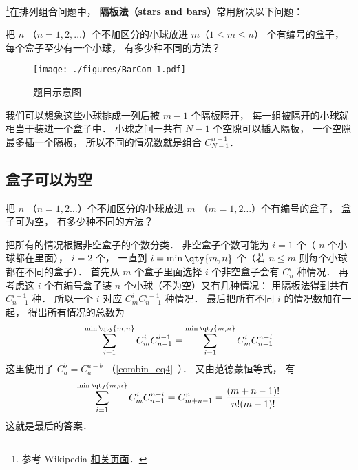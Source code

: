 

\footnote{参考 Wikipedia \href{https://en.wikipedia.org/wiki/Stars_and_bars_(combinatorics)}{相关页面}．}在排列组合问题中， \textbf{隔板法（stars and bars）}常用解决以下问题：

\begin{example}{}
把 $n$ （$n = 1,2,\dots$）个不加区分的小球放进 $m$（$1\leqslant m\leqslant n$） 个有编号的盒子， 每个盒子至少有一个小球， 有多少种不同的方法？
\begin{figure}[ht]
\centering
\texttt{[image: ./figures/BarCom\_1.pdf]}
\caption{题目示意图} \label{BarCom_fig1}
\end{figure}
\end{example}

我们可以想象这些小球排成一列后被 $m-1$ 个隔板隔开， 每一组被隔开的小球就相当于装进一个盒子中． 小球之间一共有 $N-1$ 个空隙可以插入隔板， 一个空隙最多插一个隔板， 所以不同的情况数就是组合 $C_{N-1}^{n-1}$．

\subsection{盒子可以为空}

\begin{example}{}
把 $n$ （$n=1,2\dots$）个不加区分的小球放进 $m$ （$m=1,2\dots$）个有编号的盒子， 盒子可为空， 有多少种不同的方法？
\end{example}

把所有的情况根据非空盒子的个数分类． 非空盒子个数可能为 $i=1$ 个（ $n$ 个小球都在里面）， $i=2$ 个， 一直到 $i=\min\qty{m,n}$ 个（若 $n\leqslant m$ 则每个小球都在不同的盒子）． 首先从 $m$ 个盒子里面选择 $i$ 个非空盒子会有 $C_n^i$ 种情况． 再考虑这 $i$ 个有编号盒子装 $n$ 个小球（不为空）又有几种情况： 用隔板法得到共有 $C_{n-1}^{i-1}$ 种． 所以一个 $i$ 对应 $C_m^i C_{n-1}^{i-1}$ 种情况． 最后把所有不同 $i$ 的情况数加在一起， 得出所有情况的总数为
\begin{equation}
\sum_{i = 1}^{\min\qty{m,n}} C_m^i C_{n-1}^{i-1} = \sum_{i=1}^{\min\qty{m,n}}  C_m^i C_{n-1}^{n-i}
\end{equation}
这里使用了 $C_a^b = C_a^{a-b}$ （\autoref{combin_eq4}~）． 又由范德蒙恒等式， 有
\begin{equation}
\sum_{i=1}^{\min\qty{m,n}}  C_m^i C_{n-1}^{n-i} = C_{m+n-1}^n = \frac{(m+n-1)!}{n!(m - 1)!}
\end{equation}
这就是最后的答案．

